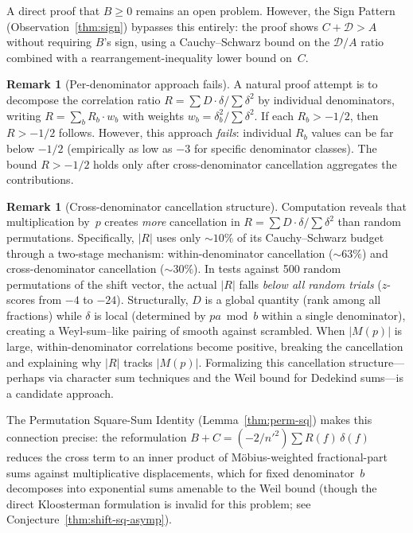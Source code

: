 \documentclass[11pt]{article}
\theoremstyle{definition}
\newtheorem{remark}[theorem]{Remark}
\begin{document}
\noindent A direct proof that $B \ge 0$ remains an open problem.
However, the Sign Pattern (Observation~\ref{thm:sign}) bypasses
this entirely: the proof shows $C + \mathcal{D} > A$
without requiring $B$'s sign, using a Cauchy--Schwarz bound on
the $\mathcal{D}/A$ ratio
combined with a rearrangement-inequality lower bound on~$C$.

\begin{remark}[Per-denominator approach fails]

A natural proof attempt is to decompose the correlation ratio
$R = \sum D \cdot \delta / \sum \delta^2$ by individual
denominators, writing $R = \sum_b R_b \cdot w_b$ with
weights $w_b = \delta_b^2 / \sum \delta^2$.  If each
$R_b > -1/2$, then $R > -1/2$ follows.  However, this
approach \emph{fails}: individual $R_b$ values can be
far below $-1/2$ (empirically as low as $-3$ for specific
denominator classes).  The bound $R > -1/2$ holds only
after cross-denominator cancellation aggregates the
contributions.
\end{remark}

\begin{remark}[Cross-denominator cancellation structure]
\label{rem:R-cancel}
Computation reveals that multiplication by~$p$ creates
\emph{more} cancellation in $R = \sum D \cdot \delta / \sum \delta^2$
than random permutations.  Specifically, $|R|$ uses only
${\sim}10\%$ of its Cauchy--Schwarz budget through a two-stage
mechanism: within-denominator cancellation (${\sim}63\%$)
and cross-denominator cancellation (${\sim}30\%$).  In tests
against 500 random permutations of the shift vector, the
actual $|R|$ falls \emph{below all random trials} ($z$-scores
from $-4$ to $-24$).  Structurally, $D$ is a global quantity
(rank among all fractions) while $\delta$ is local (determined
by $pa \bmod b$ within a single denominator), creating a
Weyl-sum--like pairing of smooth against scrambled.  When
$|M(p)|$ is large, within-denominator correlations become
positive, breaking the cancellation and explaining why
$|R|$ tracks $|M(p)|$.  Formalizing this cancellation
structure---perhaps via character sum techniques and the
Weil bound for Dedekind sums---is a
candidate approach.

The Permutation Square-Sum Identity
(Lemma~\ref{thm:perm-sq}) makes this connection
precise: the reformulation $B + C = (-2/{n'}^2)\sum R(f)\,\delta(f)$
reduces the cross term to an inner product of
M\"obius-weighted fractional-part sums against
multiplicative displacements, which for fixed denominator~$b$
decomposes into exponential sums amenable to the
Weil bound (though the direct Kloosterman formulation
is invalid for this problem; see Conjecture~\ref{thm:shift-sq-asymp}).
\end{remark}
\end{document}
